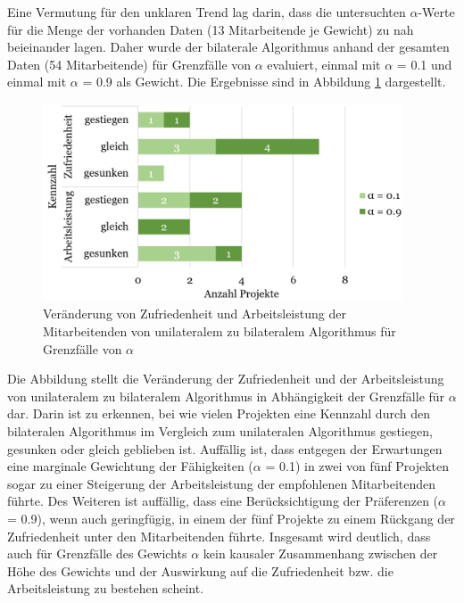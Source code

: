Eine Vermutung für den unklaren Trend lag darin, dass die untersuchten $\alpha$-Werte für die Menge der vorhanden Daten (13 Mitarbeitende je Gewicht) zu nah beieinander lagen.
Daher wurde der bilaterale Algorithmus anhand der gesamten Daten (54 Mitarbeitende) für Grenzfälle von $\alpha$ evaluiert, einmal mit $\alpha$ = 0.1 und einmal mit $\alpha$ = 0.9 als Gewicht.
Die Ergebnisse sind in Abbildung \ref{fig:diskussion:abb1} dargestellt.

\begin{figure}[H]
    \centering
	\includegraphics[width=0.95\textwidth]{gfx/verhaeltnis-z-a-projekte-edge-cases.png}
	\caption[Veränderung von Zufriedenheit und Arbeitsleistung der Mitarbeitenden von unilateralem zu bilateralem Algorithmus für Grenzfälle von $\alpha$]{Veränderung von Zufriedenheit und Arbeitsleistung der Mitarbeitenden von unilateralem zu bilateralem Algorithmus für Grenzfälle von $\alpha$}
	\label{fig:diskussion:abb1}
\end{figure}

Die Abbildung stellt die Veränderung der Zufriedenheit und der Arbeitsleistung von unilateralem zu bilateralem Algorithmus in Abhängigkeit der Grenzfälle für $\alpha$ dar.
Darin ist zu erkennen, bei wie vielen Projekten eine Kennzahl durch den bilateralen Algorithmus im Vergleich zum unilateralen Algorithmus gestiegen, gesunken oder gleich geblieben ist.
Auffällig ist, dass entgegen der Erwartungen eine marginale Gewichtung der Fähigkeiten ($\alpha$ = 0.1) in zwei von fünf Projekten sogar zu einer Steigerung der Arbeitsleistung der empfohlenen Mitarbeitenden führte.
Des Weiteren ist auffällig, dass eine Berücksichtigung der Präferenzen ($\alpha$ = 0.9), wenn auch geringfügig, in einem der fünf Projekte zu einem Rückgang der Zufriedenheit unter den Mitarbeitenden führte.
Insgesamt wird deutlich, dass auch für Grenzfälle des Gewichts $\alpha$ kein kausaler Zusammenhang zwischen der Höhe des Gewichts und der Auswirkung auf die Zufriedenheit bzw. die Arbeitsleistung zu bestehen scheint.

